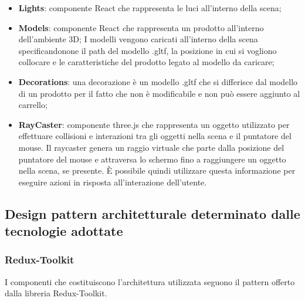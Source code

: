 \begin{itemize}
\begin{itemize}
			\item \textbf{Lights}: componente React che rappresenta le luci all'interno della scena;
			\item \textbf{Models}: componente React che rappresenta un prodotto all'interno dell'ambiente 3D;
			I modelli vengono caricati all'interno della scena specificandonone il path del modello .gltf, la posizione
			in cui si vogliono collocare e le caratteristiche del prodotto legato al modello da caricare;
			\item \textbf{Decorations}: una decorazione è un modello .gltf che si differisce dal modello di un prodotto 
			per il fatto che non è modificabile e non può essere aggiunto al carrello;
			\item \textbf{RayCaster}: componente three.js che rappresenta un oggetto utilizzato per effettuare 
			collisioni e interazioni tra gli oggetti nella scena e il puntatore del mouse.
			Il raycaster genera un raggio virtuale che parte dalla posizione del puntatore del mouse e attraversa lo schermo fino a 
			raggiungere un oggetto nella scena, se presente. 
			È possibile quindi utilizzare questa informazione per eseguire azioni in risposta all'interazione dell'utente.
		\end{itemize}
\end{itemize}
\subsection{Design pattern architetturale determinato dalle tecnologie adottate}
\label{design Redux}

\subsubsection{Redux-Toolkit}
I componenti che costituiscono l'architettura utilizzata seguono il pattern offerto dalla libreria Redux-Toolkit.

